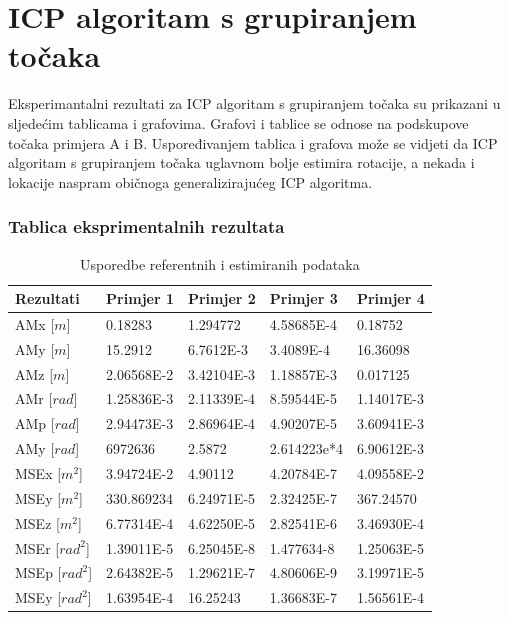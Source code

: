 \section{ICP algoritam s grupiranjem točaka}
Eksperimantalni rezultati za ICP algoritam s grupiranjem točaka su prikazani u sljedećim tablicama i grafovima. Grafovi i tablice se odnose na podskupove točaka primjera A i B. Uspoređivanjem tablica i grafova može se vidjeti da ICP algoritam s grupiranjem točaka uglavnom bolje estimira rotacije, a nekada i lokacije naspram običnoga generalizirajućeg ICP algoritma.

\subsubsection{Tablica eksprimentalnih rezultata}
\begin{table}[H]
  \centering
  \begin{tabular}{ |p{3cm}| |p{2cm}|p{2cm}|p{2cm}|p{2cm}| }
    \hline
    Rezultati& Primjer 1& Primjer 2&Primjer 3& Primjer 4\\
    \hline
    AMx [$m$]& 0.18283& 1.294772& 4.58685E-4& 0.18752\\
    AMy [$m$]& 15.2912& 6.7612E-3& 3.4089E-4& 16.36098\\
    AMz [$m$]& 2.06568E-2& 3.42104E-3& 1.18857E-3& 0.017125\\
    AMr [$rad$]& 1.25836E-3& 2.11339E-4& 8.59544E-5& 1.14017E-3\\
    AMp [$rad$]& 2.94473E-3& 2.86964E-4& 4.90207E-5& 3.60941E-3\\
    AMy [$rad$]& 6972636& 2.5872& 2.614223e*4& 6.90612E-3\\
    \hline
    MSEx [$m^2$]& 3.94724E-2& 4.90112& 4.20784E-7& 4.09558E-2\\
    MSEy [$m^2$]& 330.869234& 6.24971E-5& 2.32425E-7& 367.24570\\
    MSEz [$m^2$]& 6.77314E-4& 4.62250E-5& 2.82541E-6& 3.46930E-4\\
    MSEr [$rad^2$]& 1.39011E-5& 6.25045E-8& 1.477634-8& 1.25063E-5\\
    MSEp [$rad^2$]& 2.64382E-5& 1.29621E-7& 4.80606E-9& 3.19971E-5\\
    MSEy [$rad^2$]& 1.63954E-4& 16.25243& 1.36683E-7& 1.56561E-4\\
    \hline
  \end{tabular}
  \caption{Usporedbe referentnih i estimiranih podataka}
  \label{res:ref_est_table}
\end{table}
\pagebreak
